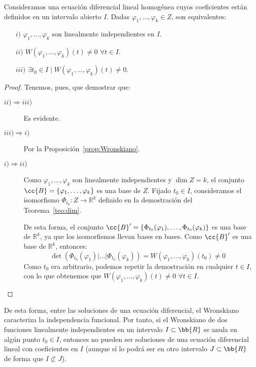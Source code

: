 \begin{prop}
    Consideramos una ecuación diferencial lineal homogénea cuyos coeficientes están definidos en un intervalo abierto $I$. Dadas $\varphi_1,\ldots,\varphi_k\in Z$, son equivalentes:
    \begin{enumerate}
        \item[$i)$] $\varphi_1,\ldots,\varphi_k$ son linealmente independientes en $I$.
        \item[$ii)$] $W(\varphi_1,\ldots,\varphi_k)(t) \neq 0$ $\forall t\in I$.
        \item[$iii)$] $\exists t_0\in I \mid W(\varphi_1,\ldots,\varphi_k)(t) \neq 0$.
    \end{enumerate}
    \begin{proof}
        Tenemos, pues, que demostrar que:
        \begin{description}
            \item [$ii)\Rightarrow iii)$] Es evidente.
            \item [$iii) \Rightarrow i)$] Por la Proposición~\ref{prop:Wronskiano}.
            \item [$i) \Rightarrow ii)$] Como $\varphi_1,\ldots,\varphi_k$ son linealmente independientes y $\dim Z=k$, el conjunto $\cc{B}=\{\varphi_1,\ldots,\varphi_k\}$ es una base de $Z$. Fijado $t_0\in I$, consideramos el isomorfismo $\Phi_{t_0}:Z\rightarrow\mathbb{R}^k$ definido en la demostración del Teorema~\ref{teo:dim}.

                De esta forma, el conjunto $\cc{B}'=\{\Phi_{t_0}(\varphi_1),\ldots,\Phi_{t_0}(\varphi_k)\}$ es una base de $\mathbb{R}^k$, ya que los isomorfismos llevan bases en bases.
                Como $\cc{B}'$ es una base de $\mathbb{R}^k$, entonces:
                \begin{equation*}
                    \det(\Phi_{t_0}(\varphi_1)|\ldots|\Phi_{t_0}(\varphi_k)) = W(\varphi_1,\ldots,\varphi_k)(t_0) \neq 0
                \end{equation*}
                Como $t_0$ era arbitrario, podemos repetir la demostración en cualquier $t\in I$, con lo que obtenemos que $W(\varphi_1,\ldots,\varphi_k)(t) \neq 0$ $\forall t\in I$.
        \end{description}
    \end{proof}
\end{prop}
De esta forma, entre las soluciones de una ecuación diferencial, el Wronskiano caracteriza la independencia funcional. Por tanto, si el Wronskiano de dos funciones linealmente independientes en un intervalo $I\subset \bb{R}$ se anula en algún punto $t_0\in I$, entonces no pueden ser soluciones de una ecuación diferencial lineal con coeficientes en $I$ (aunque sí lo podrá ser en otro intervalo $J\subset \bb{R}$ de forma que $I\not\subset J$).

